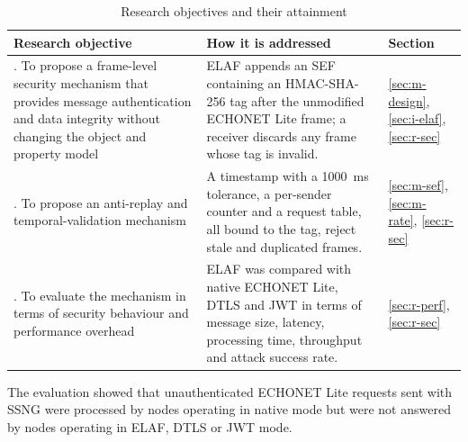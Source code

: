 \begin{table}[htbp]
  \centering
  \caption{Research objectives and their attainment}
  \label{tab:c-objectives}
  \footnotesize
  \renewcommand{\arraystretch}{1.2}
  \begin{tabularx}{\textwidth}{@{}>{\raggedright\arraybackslash}p{4.2cm} >{\raggedright\arraybackslash}X >{\raggedright\arraybackslash}p{2.8cm}@{}}
    \toprule
    \textbf{Research objective}                                                                                                     & \textbf{How it is addressed}                                                                                                                                             & \textbf{Section}                                                    \\
    \midrule
    1. To propose a frame-level security mechanism that provides message authentication and data integrity without changing the object and property model & ELAF appends an SEF containing an HMAC-SHA-256 tag after the unmodified ECHONET Lite frame; a receiver discards any frame whose tag is invalid. \tbd{}                     & \ref{sec:m-design}, \ref{sec:i-elaf}, \ref{sec:r-sec}               \\
    2. To propose an anti-replay and temporal-validation mechanism                                                                 & A timestamp with a 1000~ms tolerance, a per-sender counter and a request table, all bound to the tag, reject stale and duplicated frames. \tbd{}                         & \ref{sec:m-sef}, \ref{sec:m-rate}, \ref{sec:r-sec}                  \\
    3. To evaluate the mechanism in terms of security behaviour and performance overhead                                           & ELAF was compared with native ECHONET Lite, DTLS and JWT in terms of message size, latency, processing time, throughput and attack success rate. \tbd{}                  & \ref{sec:r-perf}, \ref{sec:r-sec}                                   \\
    \bottomrule
  \end{tabularx}
\end{table}

The evaluation showed that unauthenticated ECHONET Lite requests sent with SSNG were processed by nodes operating in native mode but were not answered by nodes operating in ELAF, DTLS or JWT mode.

